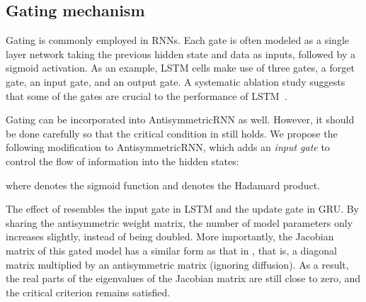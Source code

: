 \subsection{Gating mechanism}
\label{sec:gating_mechanism}

Gating is commonly employed in RNNs.
Each gate is often modeled as a single layer network taking the previous hidden state  and data  as inputs, followed by a sigmoid activation.
As an example, LSTM cells make use of three gates, a forget gate, an input gate, and an output gate.
A systematic ablation study suggests that some of the gates are crucial to the performance of LSTM~\citep{jozefowicz2015empirical}.


Gating can be incorporated into AntisymmetricRNN as well.
However, it should be done carefully so that the critical condition in  still holds.
We propose the following modification to AntisymmetricRNN, which adds an \textit{input gate}  to control the flow of information into the hidden states: 

where  denotes the sigmoid function and  denotes the Hadamard product.


The effect of  resembles the input gate in LSTM and the update gate in GRU.
By sharing the antisymmetric weight matrix, the number of model parameters only increases slightly, instead of being doubled.
More importantly, the Jacobian matrix of this gated model has a similar form as that in , that is, a diagonal matrix multiplied by an antisymmetric matrix (ignoring diffusion).
As a result, the real parts of the eigenvalues of the Jacobian matrix are still close to zero, and the critical criterion remains satisfied.

